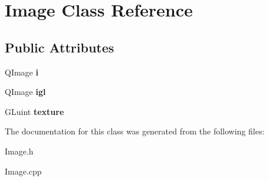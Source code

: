 \hypertarget{classImage}{\section{\-Image \-Class \-Reference}
\label{classImage}
}
\subsection*{\-Public \-Attributes}
\begin{DoxyCompactItemize}
\item 
\hypertarget{classImage_a090be627da2f913d63074cb6db7ded61}{\-Q\-Image {\bfseries i}}\label{classImage_a090be627da2f913d63074cb6db7ded61}

\item 
\hypertarget{classImage_a52d0c0e0bccec7cd4be2d8faf8311cda}{\-Q\-Image {\bfseries igl}}\label{classImage_a52d0c0e0bccec7cd4be2d8faf8311cda}

\item 
\hypertarget{classImage_afd2e917da00fbcb1e3e901437897e883}{\-G\-Luint {\bfseries texture}}\label{classImage_afd2e917da00fbcb1e3e901437897e883}

\end{DoxyCompactItemize}


\-The documentation for this class was generated from the following files\-:\begin{DoxyCompactItemize}
\item 
\-Image.\-h\item 
\-Image.\-cpp\end{DoxyCompactItemize}
